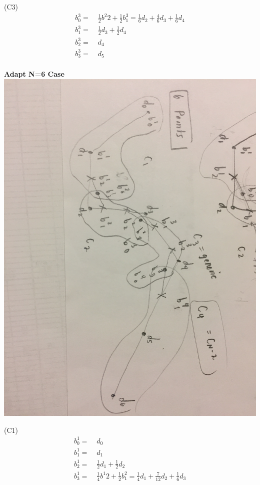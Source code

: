 \documentclass[12pt]{article}
\begin{document}
(C3)
\begin{align*}
b^{3}_{0} =&\; \frac{1}{2} b^{2}{2} + \frac{1}{2} b^{3}_{1} =\frac{1}{6}d_2 +\frac{4}{6}d_3 + \frac{1}{6}d_4 \\
b^{3}_{1} =&\; \frac{1}{2}d_3 + \frac{1}{2} d_4 \\
b^{3}_{2} =&\; d_4 \\
b^{3}_{3} =&\; d_5 \\
\end{align*}

\vspace {0.25cm}\noindent
{\bf Adapt N=6 Case} \\

\includegraphics[scale=.1]{6Points}

(C1)
\begin{align*}
b^{1}_{0} =&\; d_0 \\
b^{1}_{1} =&\; d_1 \\
b^{1}_{2} =&\; \frac{1}{2} d_1 + \frac{1}{2}d_2 \\
b^{1}_{3} =&\; \frac{1}{4} b^{1}{2} + \frac{1}{2} b^{2}_{1} =\frac{1}{4}d_1 +\frac{7}{12}d_2 + \frac{1}{6}d_3 \\
\end{align*}
\end{document}

